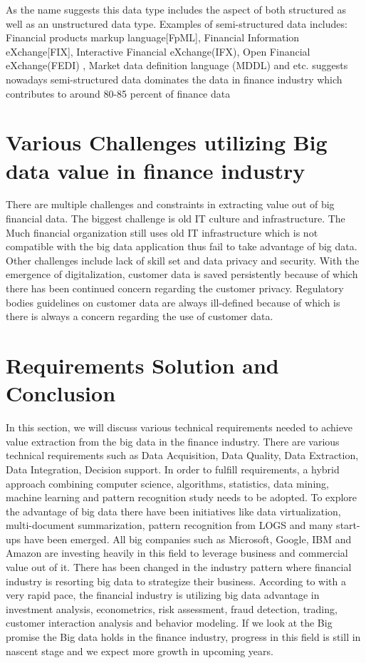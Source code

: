 \documentclass[sigconf]{acmart}
\begin{document}
As the name suggests this data type includes the aspect of both structured as well as an unstructured data type. Examples of semi-structured data includes: Financial products markup language[FpML], Financial Information eXchange[FIX], Interactive Financial eXchange(IFX), Open Financial eXchange(FEDI) , Market data definition language (MDDL) and etc. \cite{Ref1} suggests nowadays semi-structured data dominates the data in finance industry which contributes to around 80-85 percent of finance data

\section{Various Challenges utilizing Big data value in finance industry }

There are multiple challenges and constraints in extracting value out of big financial data. The biggest challenge is old IT culture and infrastructure. The Much financial organization still uses old IT infrastructure which is not compatible with the big data application thus fail to take advantage of big data. Other challenges include lack of skill set and data privacy and security. With the emergence of digitalization, customer data is saved persistently because of which there has been continued concern regarding the customer privacy. Regulatory bodies guidelines on customer data are always ill-defined because of which is there is always a concern regarding the use of customer data.  

\section{Requirements Solution and Conclusion }

In this section, we will discuss various technical requirements needed to achieve value extraction from the big data in the finance industry. There are various technical requirements such as Data Acquisition, Data Quality, Data Extraction, Data Integration, Decision support. In order to fulfill requirements, a hybrid approach combining computer science, algorithms, statistics, data mining, machine learning and pattern recognition study needs to be adopted. To explore the advantage of big data there have been initiatives like data virtualization, multi-document summarization, pattern recognition from LOGS and many start-ups have been emerged.  All big companies such as Microsoft, Google, IBM and Amazon are investing heavily in this field to leverage business and commercial value out of it. There has been changed in the industry pattern where financial industry is resorting big data to strategize their business. According to \cite{Ref3}  with a very rapid pace, the financial industry is utilizing big data advantage in investment analysis, econometrics, risk assessment, fraud detection, trading, customer interaction analysis and behavior modeling. If we look at the Big promise the Big data holds in the finance industry, progress in this field is still in nascent stage and we expect more growth in upcoming years.  



 
\end{document}
